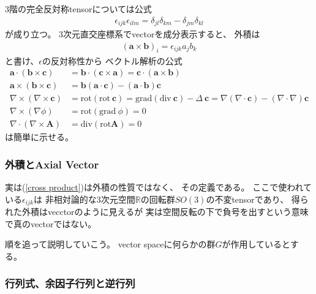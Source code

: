 $3$階の完全反対称tensorについては公式
\begin{align}
    \epsilon_{ijk}\epsilon_{ilm}
    =
    \delta_{jl}\delta_{km}
    -
    \delta_{jm}\delta_{kl}
\label{3rd order epsilon to delta2 formula}
\end{align}
が成り立つ。
$3$次元直交座標系でvectorを成分表示すると、
外積は
\begin{align}
    (\bm{a} \times \bm{b})_i
    =
    \epsilon_{ijk}
    a_j b_k
\label{cross product}
\end{align}
と書け、$\epsilon$の反対称性から
ベクトル解析の公式
\begin{subequations}
\begin{align}
    \bm{a} \cdot (\bm{b} \times \bm{c})
    &=
    \bm{b} \cdot (\bm{c} \times \bm{a})
    =
    \bm{c} \cdot (\bm{a} \times \bm{b})
\\
    \bm{a} \times (\bm{b} \times \bm{c})
    &=
    \bm{b} (\bm{a} \cdot \bm{c})
    -
    (\bm{a} \cdot \bm{b}) \bm{c}
\\
    \nabla \times (\nabla \times \bm{c})
    &=
    \mathrm{rot}(\mathrm{rot}\ \bm{c})
    =
    \mathrm{grad}(\mathrm{div}\ \bm{c})
    -
    \Delta\ \bm{c}
    =
    \nabla (\nabla \cdot \bm{c})
    -
    (\nabla \cdot \nabla) \bm{c}
\\
    \nabla \times (\nabla \phi)
    &=
    \mathrm{rot}(\mathrm{grad}\ \phi)
    = 0
\\
    \nabla \cdot (\nabla \times \bm{A})
    &=
    \mathrm{div}(\mathrm{rot}\bm{A})
    = 0
\end{align}
\end{subequations}
は簡単に示せる。

\subsubsection{外積とAxial Vector}

実は(\ref{cross product})は外積の性質ではなく、
その定義である。
ここで使われている$\epsilon_{ijk}$は
非相対論的な$3$次元空間$\mathbb{R}$の回転群$SO(3)$の不変tensorであり、
得られた外積はvecctorのように見えるが
実は空間反転の下で負号を出すという意味で真のvectorではない。

順を追って説明していこう。
vector spaceに何らかの群$G$が作用しているとする。

\subsubsection{行列式、余因子行列と逆行列}

